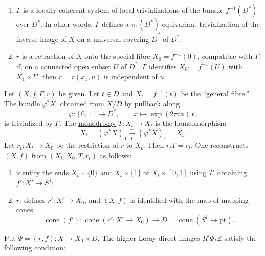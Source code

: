 \begin{enumerate}[label=(\alph*),leftmargin=2.6em]
\item $\Gamma$ is a locally coherent system of local trivializations of
the bundle $f^{-1}(D^*)$ over $D^*$.  In other words, $\Gamma$ defines a
$\pi_1(D^*)$-equivariant trivialization of the inverse image of $X$ on a
universal covering $\widetilde D^*$ of $D^*$.

\item $r$ is a retraction of $X$ onto the special fibre
$X_0=f^{-1}(0)$, compatible with $\Gamma$: if, on a connected open
subset $U$ of $D^*$, $\Gamma$ identifies
$X_U=f^{-1}(U)$ with $X_1\times U$, then $r=r(x_1,u)$ is independent of
$u$.
\end{enumerate}

Let $(X,f,\Gamma,r)$ be given.  Let $t\in D$ and
$X_t=f^{-1}(t)$ be the ``general fibre.''  The bundle $\varphi^*X$,
obtained from $X/D$ by pullback along
\begin{equation*}
\varphi:[0,1]\longrightarrow D^*,
\qquad x\longmapsto \exp(2\pi i x)\,t,
\end{equation*}
is trivialized by $\Gamma$.  The \underline{monodromy}
$T:X_t\longrightarrow X_t$ is the homeomorphism
\begin{equation*}
X_t=(\varphi^*X)_0\xrightarrow[\Gamma]{\sim}
(\varphi^*X)_1=X_t.
\end{equation*}
Let $r_t:X_t\longrightarrow X_0$ be the restriction of $r$ to $X_t$.
Then $r_tT=r_t$.  One reconstructs $(X,f)$ from
$(X_t,X_0,T,r_t)$ as follows:
\begin{enumerate}[label=(\alph*),leftmargin=2.6em]
\item identify the ends $X_t\times\{0\}$ and $X_t\times\{1\}$ of
$X_t\times[0,1]$ using $T$, obtaining $f':X'\longrightarrow S^1$;
\item $r_t$ defines $r':X'\longrightarrow X_0$, and $(X,f)$ is
identified with the map of mapping cones
\begin{equation*}
\operatorname{cone}(f'):
\operatorname{cone}(r':X'\longrightarrow X_0)
\longrightarrow D=\operatorname{cone}(S^1\longrightarrow\mathrm{pt}).
\end{equation*}
\end{enumerate}


Put $\Psi=(r,f):X\longrightarrow X_0\times D$.  The higher Leray direct
images $R^i\Psi_*\mathbb Z$ satisfy the following condition:

